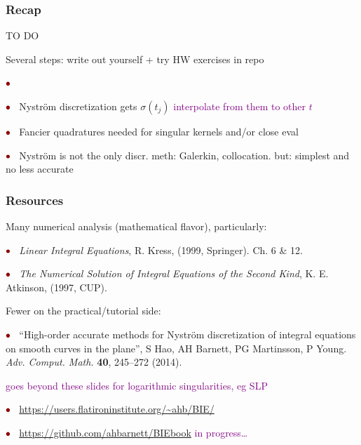 \documentclass[t]{beamer}
\newcommand{\ft}[1]{\frametitle{#1}}
\newcommand{\com}[1]{{\scriptsize \textcolor{purple}{#1}}}      %
\newcommand{\sg}{\vspace{1ex}}
\newcommand{\hg}{\vspace{0.5ex}}
\newcommand{\rb}{\ensuremath{\textcolor{darkred}{\bullet\;}}\ }
\begin{document}
\begin{frame}\ft{Recap}

TO DO

Several steps: write out yourself + try HW exercises in repo

  \rb

  \rb Nystr\"om discretization gets $\sigma(t_j)$ \com{interpolate from them to other $t$}

  \rb Fancier quadratures needed for singular kernels and/or close eval

\rb Nystr\"om is not the only discr. meth: Galerkin, collocation.
but: simplest and no less accurate



  
\end{frame}


\begin{frame}\ft{Resources}  %

Many numerical analysis (mathematical flavor), particularly:

\hg

\rb {\em Linear Integral Equations}, R. Kress, (1999, Springer). Ch. 6 \& 12.

\hg

\rb {\em The Numerical Solution of Integral Equations of the Second Kind},
K. E. Atkinson, (1997, CUP).




\sg

Fewer on the practical/tutorial side:

\hg

\rb ``High-order accurate methods for Nystr\"om discretization of integral equations on smooth curves in the plane'', S Hao, AH Barnett, PG Martinsson, P Young.
{\em Adv. Comput. Math.} {\bf 40}, 245--272 (2014).

\hfill \com{goes beyond these slides for logarithmic singularities,
  eg SLP}

\hg

\rb \url{https://users.flatironinstitute.org/~ahb/BIE/}

\hg

\rb \url{https://github.com/ahbarnett/BIEbook} \hfill \com{in progress\dots}

\end{frame}
\end{document}
